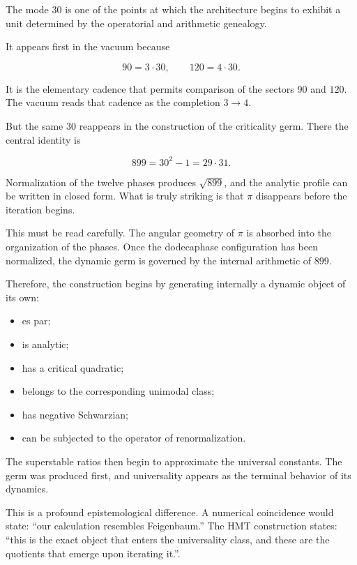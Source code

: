 The mode \(30\) is one of the points at which the architecture begins to exhibit a unit determined by the operatorial and arithmetic genealogy.\par

It appears first in the vacuum because\par

\[
90=3\cdot30,
\qquad
120=4\cdot30.
\]

It is the elementary cadence that permits comparison of the sectors \(90\) and \(120\). The vacuum reads that cadence as the completion \(3\to4\).\par

But the same \(30\) reappears in the construction of the criticality germ. There the central identity is\par

\[
899=30^2-1=29\cdot31.
\]

Normalization of the twelve phases produces \(\sqrt{899}\), and the analytic profile can be written in closed form. What is truly striking is that \(\pi\) disappears before the iteration begins.\par

This must be read carefully. The angular geometry of \(\pi\) is absorbed into the organization of the phases. Once the dodecaphase configuration has been normalized, the dynamic germ is governed by the internal arithmetic of \(899\).\par

Therefore, the construction begins by generating internally a dynamic object of its own:\par

\begin{itemize}[leftmargin=*,itemsep=0.35em]
\item es par;
\item is analytic;
\item has a critical quadratic;
\item belongs to the corresponding unimodal class;
\item has negative Schwarzian;
\item can be subjected to the operator of renormalization.
\end{itemize}

The superstable ratios then begin to approximate the universal constants. The germ was produced first, and universality appears as the terminal behavior of its dynamics.\par

This is a profound epistemological difference. A numerical coincidence would state: “our calculation resembles Feigenbaum.” The HMT construction states: “this is the exact object that enters the universality class, and these are the quotients that emerge upon iterating it.”.\par

